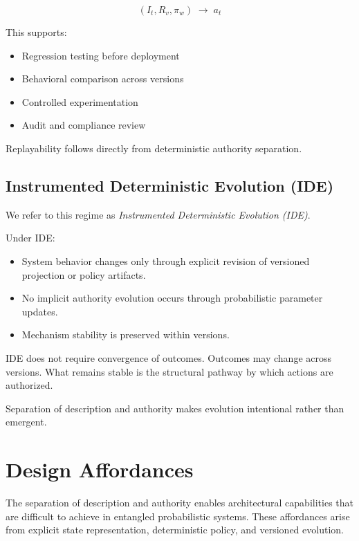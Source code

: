 \documentclass[11pt]{article}
\begin{document}
\[
(I_t, R_v, \pi_w) \;\rightarrow\; a_t
\]

This supports:

\begin{itemize}
  \item Regression testing before deployment
  \item Behavioral comparison across versions
  \item Controlled experimentation
  \item Audit and compliance review
\end{itemize}

Replayability follows directly from deterministic authority separation.


\subsection{Instrumented Deterministic Evolution (IDE)}

We refer to this regime as \emph{Instrumented Deterministic Evolution (IDE)}.

Under IDE:

\begin{itemize}
  \item System behavior changes only through explicit revision of versioned projection or policy artifacts.
  \item No implicit authority evolution occurs through probabilistic parameter updates.
  \item Mechanism stability is preserved within versions.
\end{itemize}

IDE does not require convergence of outcomes. Outcomes may change across versions. What remains stable is the structural pathway by which actions are authorized.

Separation of description and authority makes evolution intentional rather than emergent.


\section{Design Affordances}

The separation of description and authority enables architectural capabilities that are difficult to achieve in entangled probabilistic systems. These affordances arise from explicit state representation, deterministic policy, and versioned evolution.
\end{document}
